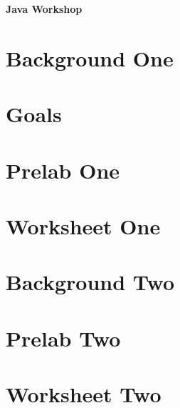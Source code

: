 \documentclass{article}
\renewcommand{\maketitle}{
   \begin{center}
      {\Huge \bfseries Java Workshop}
   \end{center}
}
\begin{document}
\maketitle

\section{Background One}

\pagebreak

\section{Goals}

\pagebreak

\section{Prelab One}

\pagebreak

\section{Worksheet One}

\pagebreak

\section{Background Two}
\pagebreak

\section{Prelab Two}
\pagebreak

\section{Worksheet Two}
\pagebreak
\end{document}
